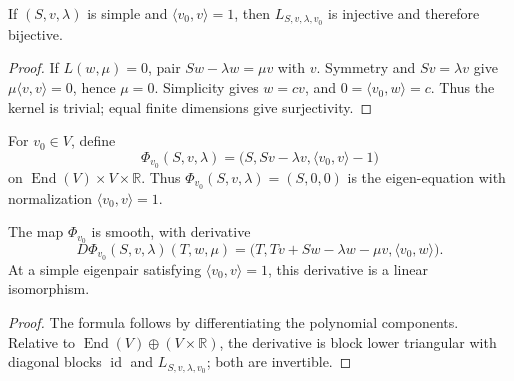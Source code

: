 \begin{lemma}
\label{lem:eigen-linearisation-injective}





If $(S,v,\lambda)$ is simple and $\langle v_0,v\rangle=1$, then
$L_{S,v,\lambda,v_0}$ is injective and therefore bijective.
\end{lemma}

\begin{proof}

\sketch If $L(w,\mu)=0$, pair $Sw-\lambda w=\mu v$ with $v$. Symmetry and
$Sv=\lambda v$ give $\mu\langle v,v\rangle=0$, hence $\mu=0$. Simplicity gives
$w=cv$, and $0=\langle v_0,w\rangle=c$. Thus the kernel is trivial; equal finite
dimensions give surjectivity.
\end{proof}

\begin{definition}
\label{def:augmented-eigen-equation}




For $v_0\in V$, define
\[
\Phi_{v_0}(S,v,\lambda)
=\bigl(S,Sv-\lambda v,\langle v_0,v\rangle-1\bigr)
\]
on $\operatorname{End}(V)\times V\times\mathbb R$. Thus
$\Phi_{v_0}(S,v,\lambda)=(S,0,0)$ is the eigen-equation with normalization
$\langle v_0,v\rangle=1$.
\end{definition}

\begin{lemma}
\label{lem:augmented-eigen-equation-derivative}





The map $\Phi_{v_0}$ is smooth, with derivative
\[
D\Phi_{v_0}(S,v,\lambda)(T,w,\mu)
=\bigl(T,Tv+Sw-\lambda w-\mu v,\langle v_0,w\rangle\bigr).
\]
At a simple eigenpair satisfying $\langle v_0,v\rangle=1$, this derivative is a
linear isomorphism.
\end{lemma}

\begin{proof}

\sketch The formula follows by differentiating the polynomial components. Relative
to $\operatorname{End}(V)\oplus(V\times\mathbb R)$, the derivative is block lower
triangular with diagonal blocks $\operatorname{id}$ and
$L_{S,v,\lambda,v_0}$; both are invertible.
\end{proof}

